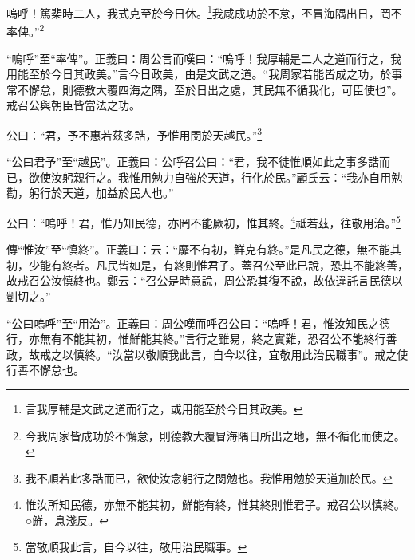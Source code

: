 嗚呼！篤棐時二人，我式克至於今日休。\footnote{言我厚輔是文武之道而行之，或用能至於今日其政美。}我咸成功於不怠，丕冒海隅出日，罔不率俾。”\footnote{今我周家皆成功於不懈怠，則德教大覆冒海隅日所出之地，無不循化而使之。}

{\noindent\shu{}\fzkt “嗚呼”至“率俾”。正義曰：周公言而嘆曰：“嗚呼！我厚輔是二人之道而行之，我用能至於今日其政美。”言今日政美，由是文武之道。“我周家若能皆成之功，於事常不懈怠，則德教大覆四海之隅，至於日出之處，其民無不循我化，可臣使也”。戒召公與朝臣皆當法之功。 \par}

公曰：“君，予不惠若茲多誥，予惟用閔於天越民。”\footnote{我不順若此多誥而已，欲使汝念躬行之閔勉也。我惟用勉於天道加於民。}

{\noindent\shu{}\fzkt “公曰君予”至“越民”。正義曰：公呼召公曰：“君，我不徒惟順如此之事多誥而已，欲使汝躬親行之。我惟用勉力自強於天道，行化於民。”顧氏云：“我亦自用勉勸，躬行於天道，加益於民人也。” \par}

公曰：“嗚呼！君，惟乃知民德，亦罔不能厥初，惟其終。\footnote{惟汝所知民德，亦無不能其初，鮮能有終，惟其終則惟君子。戒召公以慎終。○鮮，息淺反。}祗若茲，往敬用治。”\footnote{當敬順我此言，自今以往，敬用治民職事。}


{\noindent\zhuan{}\fzbyks 傳“惟汝”至“慎終”。正義曰：云：“靡不有初，鮮克有終。”是凡民之德，無不能其初，少能有終者。凡民皆如是，有終則惟君子。蓋召公至此已說，恐其不能終善，故戒召公汝慎終也。鄭云：“召公是時意說，周公恐其復不說，故依違託言民德以剴切之。” \par}

{\noindent\shu{}\fzkt “公曰嗚呼”至“用治”。正義曰：周公嘆而呼召公曰：“嗚呼！君，惟汝知民之德行，亦無有不能其初，惟鮮能其終。”言行之雖易，終之實難，恐召公不能終行善政，故戒之以慎終。“汝當以敬順我此言，自今以往，宜敬用此治民職事”。戒之使行善不懈怠也。 \par}

